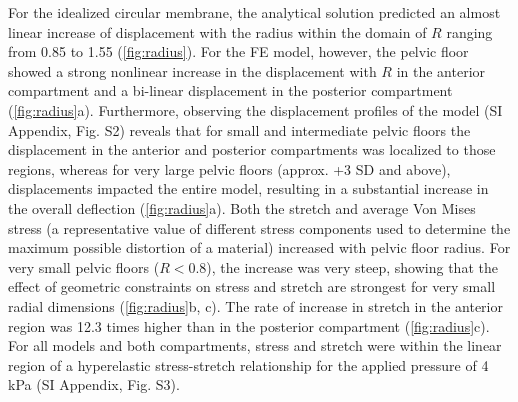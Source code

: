 \documentclass[9pt,twocolumn,twoside]{pnas-new}
\begin{document}
For the idealized circular membrane, the analytical solution predicted an almost linear increase of displacement with the radius within the domain of $R$ ranging from 0.85 to 1.55 (\cref{fig:radius}). For the FE model, however, the pelvic floor showed a strong nonlinear increase in the displacement with $R$ in the anterior compartment and a bi-linear displacement in the posterior compartment (\cref{fig:radius}a). Furthermore, observing the displacement profiles of the model (SI Appendix, Fig. S2) reveals that for small and intermediate pelvic floors the displacement in the anterior and posterior compartments was localized to those regions, whereas for very large pelvic floors (approx. +3 SD and above), displacements impacted the entire model, resulting in a substantial increase in the overall deflection (\cref{fig:radius}a).  
Both the stretch and average Von Mises stress (a representative value of different stress components used to determine the maximum possible distortion of a material) increased with pelvic floor radius. For very small pelvic floors ($R<0.8$), the increase was very steep, showing that the effect of geometric constraints on stress and stretch are strongest for very small radial dimensions (\cref{fig:radius}b, c). The rate of increase in stretch in the anterior region was 12.3 times higher than in the posterior compartment (\cref{fig:radius}c). For all models and both compartments, stress and stretch were within the linear region of a hyperelastic stress-stretch relationship for the applied pressure of 4 kPa (SI Appendix, Fig. S3).
\end{document}
